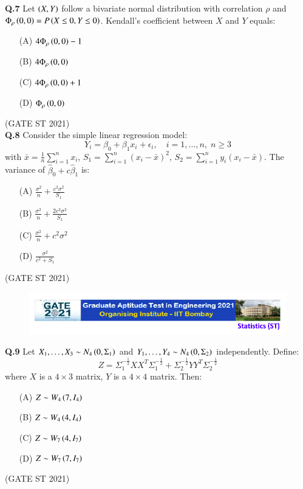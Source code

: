 \documentclass[journal,12pt,onecolumn]{IEEEtran}
\theoremstyle{remark}
\begin{document}
\textbf{Q.7}
Let $\left(X,Y\right)$ follow a bivariate normal distribution with correlation $\rho$ and $\Phi_\rho\left(0,0\right)= P\left(X \leq 0, Y \leq 0\right)$.  
Kendall's coefficient between $X$ and $Y$ equals:
\begin{enumerate}
\item[(A)] $4\Phi_\rho\left(0,0\right) - 1$
\item[(B)] $4\Phi_\rho\left(0,0\right)$
\item[(C)] $4\Phi_\rho\left(0,0\right) + 1$
\item[(D)] $\Phi_\rho\left(0,0\right)$
\end{enumerate}
\hfill (GATE ST 2021) \\

\textbf{Q.8}
Consider the simple linear regression model:
\[
Y_i = \beta_0 + \beta_1 x_i + \epsilon_i, \quad i = 1, \dots, n, \; n \geq 3
\]
with $\bar{x} = \frac{1}{n} \sum_{i=1}^n x_i$, $S_1 = \sum_{i=1}^n (x_i - \bar{x})^2$, $S_2 = \sum_{i=1}^n y_i(x_i - \bar{x})$.  
The variance of $\hat{\beta}_0 + c \hat{\beta}_1$ is:
\begin{enumerate}
\item[(A)] $\frac{\sigma^2}{n} + \frac{c^2\sigma^2}{S_1}$
\item[(B)] $\frac{\sigma^2}{n} + \frac{2c^2\sigma^2}{S_1}$
\item[(C)] $\frac{\sigma^2}{n} + c^2\sigma^2$
\item[(D)] $\frac{\sigma^2}{c^2 + S_1}$
\end{enumerate}
\hfill (GATE ST 2021) \\

 \begin{figure}
 \centering
    \includegraphics[width=1\linewidth]{figs/0.png} 
\end{figure}

\textbf{Q.9}
Let $X_1,\dots,X_3 \sim N_4\left(0,\Sigma_1\right)$ and $Y_1,\dots,Y_4 \sim N_4\left(0,\Sigma_2\right)$ independently.  
Define:
\[
Z = \Sigma_1^{-\frac12}XX^T\Sigma_1^{-\frac12} + \Sigma_2^{-\frac12}YY^T\Sigma_2^{-\frac12}
\]
where $X$ is a $4\times 3$ matrix, $Y$ is a $4\times 4$ matrix.  
Then:
\begin{enumerate}
\item[(A)] $Z \sim W_4\left(7, I_4\right)$
\item[(B)] $Z \sim W_4\left(4, I_4\right)$
\item[(C)] $Z \sim W_7\left(4, I_7\right)$
\item[(D)] $Z \sim W_7\left(7, I_7\right)$
\end{enumerate}
\hfill (GATE ST 2021) \\
\end{document}
